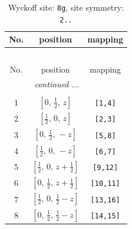 \documentclass[fleqn,8pt]{jsarticle}
\begin{document}
\renewcommand{\arraystretch}{1.2}
\begin{longtable}{ccc}
\caption{Wyckoff site: {\tt 8g}, site symmetry: {\tt 2..}}
 \\
 \hline \hline
No. & position & mapping \\ \hline \endfirsthead

\multicolumn{2}{l}{\tablename\ \thetable{}} \\
 \hline \hline
No. & position & mapping \\ \hline \endhead

 \hline \hline
\multicolumn{2}{r}{\footnotesize\it continued ...} \\ \endfoot

 \hline \hline
\multicolumn{2}{r}{} \\ \endlastfoot

1 & $\left[ 0,\, \frac{1}{2},\, z \right]$ & {\tt [1,4]} \\ \hline
2 & $\left[ \frac{1}{2},\, 0,\, z \right]$ & {\tt [2,3]} \\ \hline
3 & $\left[ 0,\, \frac{1}{2},\, - z \right]$ & {\tt [5,8]} \\ \hline
4 & $\left[ \frac{1}{2},\, 0,\, - z \right]$ & {\tt [6,7]} \\ \hline
5 & $\left[ \frac{1}{2},\, 0,\, z + \frac{1}{2} \right]$ & {\tt [9,12]} \\ \hline
6 & $\left[ 0,\, \frac{1}{2},\, z + \frac{1}{2} \right]$ & {\tt [10,11]} \\ \hline
7 & $\left[ \frac{1}{2},\, 0,\, \frac{1}{2} - z \right]$ & {\tt [13,16]} \\ \hline
8 & $\left[ 0,\, \frac{1}{2},\, \frac{1}{2} - z \right]$ & {\tt [14,15]} \\
\end{longtable}
\renewcommand{\arraystretch}{1.2}
\end{document}
